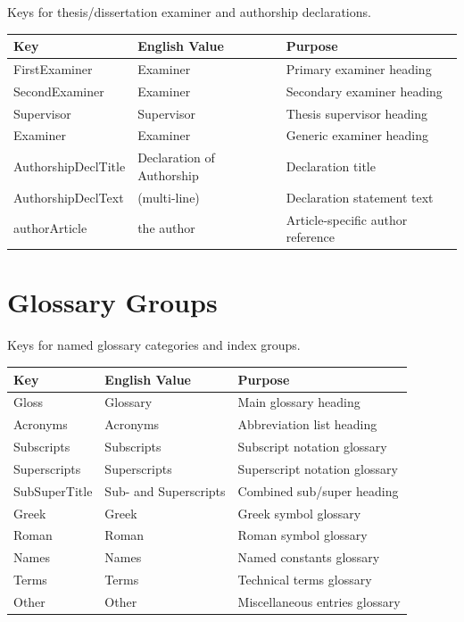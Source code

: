 Keys for thesis/dissertation examiner and authorship declarations.

\begin{tabularx}{\linewidth}{l l X}
  \toprule
  \textbf{Key} & \textbf{English Value} & \textbf{Purpose} \\
  \midrule
  FirstExaminer        & Examiner          & Primary examiner heading \\
  SecondExaminer       & Examiner          & Secondary examiner heading \\
  Supervisor           & Supervisor        & Thesis supervisor heading \\
  Examiner             & Examiner          & Generic examiner heading \\
  AuthorshipDeclTitle  & Declaration of Authorship & Declaration title \\
  AuthorshipDeclText   & (multi-line)      & Declaration statement text \\
  authorArticle        & the author        & Article-specific author reference \\
  \bottomrule
\end{tabularx}

\section{Glossary Groups}
\label{sec:tl-glossary}

Keys for named glossary categories and index groups.

\begin{tabularx}{\linewidth}{l l X}
  \toprule
  \textbf{Key} & \textbf{English Value} & \textbf{Purpose} \\
  \midrule
  Gloss         & Glossary           & Main glossary heading \\
  Acronyms      & Acronyms           & Abbreviation list heading \\
  Subscripts    & Subscripts         & Subscript notation glossary \\
  Superscripts  & Superscripts       & Superscript notation glossary \\
  SubSuperTitle & Sub- and Superscripts & Combined sub/super heading \\
  Greek         & Greek              & Greek symbol glossary \\
  Roman         & Roman              & Roman symbol glossary \\
  Names         & Names              & Named constants glossary \\
  Terms         & Terms              & Technical terms glossary \\
  Other         & Other              & Miscellaneous entries glossary \\
  \bottomrule
\end{tabularx}

